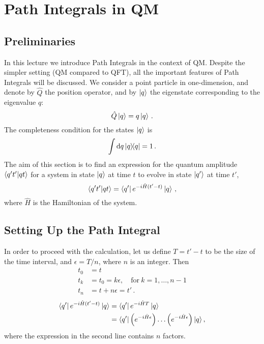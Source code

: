 \documentclass[notes]{subfiles}
\begin{document}
\chapter{Path Integrals in QM}
\label{chap:lec1}

\newcommand{\epsstep}{\left(e^{-i \hat{H} \epsilon}\right)}


\section{Preliminaries}
\label{sec:preliminaries-1}

In this lecture we introduce Path Integrals in the context of
QM. Despite the simpler setting (QM compared to QFT), all the
important features of Path Integrals will be discussed. We consider a
point particle in one-dimension, and denote by $\hat{Q}$ the position
operator, and by $\ket{q}$ the eigenstate corresponding to the eigenvalue
$q$:
\begin{equation}
  \label{eq:QEigen}
  \hat{Q} \ket{q} = q \ket{q}\, .
\end{equation}
The completeness condition for the states $\ket{q}$ is
\begin{equation}
  \label{eq:qComplete}
  \int \dd{q}\ketbra{q}{q} = 1\, .
\end{equation}
The aim of this section is to find an expression for the quantum
amplitude $\braket{q't'}{qt}$ for a system in state $\ket{q}$ at time
$t$ to evolve in state $\ket{q'}$ at time $t'$,
\begin{equation}
  \label{eq:AmplitudeDef}
  \braket{q't'}{qt} = \bra{ q'} e^{-i \hat{H} (t'-t)}\ket{q}\, ,
\end{equation}
where $\hat{H}$ is the Hamiltonian of the system. 

\section{Setting Up the Path Integral}
\label{sec:setting-up-path}

In order to proceed with the calculation, let us define $T=t'-t$ to be
the size of the time interval, and $\epsilon=T/n$, where $n$ is an
integer. Then 
\begin{align}
  t_0 &= t \\
  t_k &= t_0 = k \epsilon, \quad \text{for}\ k=1, \ldots, n-1 \\
  t_n &= t + n \epsilon = t'\, .
\end{align}
\begin{align}
  \bra{ q'} e^{-i \hat{H} (t'-t)}\ket{q} &= 
                 \bra{ q'} e^{-i \hat{H} T} \ket{q} \\
               &= \bra{ q'} \left(e^{-i \hat{H} \epsilon}\right)
                 \ldots \left(e^{-i \hat{H} \epsilon}\right) |
                 q\rangle\, ,
\end{align}
where the expression in the second line contains $n$ factors. 
\end{document}
